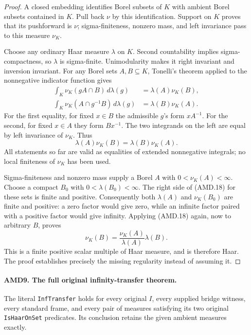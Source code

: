 \documentclass[11pt,a4paper]{article}
\numberwithin{equation}{section}
\theoremstyle{remark}\newtheorem{remark}[theorem]{Remark}
\begin{document}
\begin{proof}
A closed embedding identifies Borel subsets of \(K\) with
ambient Borel subsets contained in \(K\).  Pull back \(\nu\)
by this identification.  Support on \(K\) proves that its
pushforward is \(\nu\); sigma-finiteness, nonzero mass, and
left invariance pass to this measure \(\nu_K\).

Choose any ordinary Haar measure \(\lambda\) on \(K\).
Second countability implies sigma-compactness, so \(\lambda\)
is sigma-finite.  Unimodularity makes it right invariant and
inversion invariant.  For any Borel sets \(A,B\subseteq K\),
Tonelli's theorem applied to the nonnegative indicator function
gives
\[
\begin{split}
 \int_K\nu_K(gA\cap B)\,d\lambda(g)
        &=\lambda(A)\nu_K(B),\\
 \int_K\nu_K(A\cap g^{-1}B)\,d\lambda(g)
        &=\lambda(B)\nu_K(A).
\end{split}
 \tag{AMD.17}
\]
For the first equality, for fixed \(x\in B\) the admissible
\(g\)'s form \(xA^{-1}\).  For the second, for fixed
\(x\in A\) they form \(Bx^{-1}\).  The two integrands on
the left are equal by left invariance of \(\nu_K\).  Thus
\[
                \lambda(A)\nu_K(B)
                     =\lambda(B)\nu_K(A).
 \tag{AMD.18}
\]
All statements so far are valid as equalities of extended
nonnegative integrals; no local finiteness of \(\nu_K\)
has been used.

Sigma-finiteness and nonzero mass supply a Borel \(A\) with
\(0<\nu_K(A)<\infty\).  Choose a compact \(B_0\) with
\(0<\lambda(B_0)<\infty\).  The right side of (AMD.18) for
these sets is finite and positive.  Consequently both
\(\lambda(A)\) and \(\nu_K(B_0)\) are finite and positive:
a zero factor would give zero, while an infinite factor paired
with a positive factor would give infinity.  Applying (AMD.18)
again, now to arbitrary \(B\), proves
\[
             \nu_K(B)=
                \frac{\nu_K(A)}{\lambda(A)}\lambda(B).
 \tag{AMD.19}
\]
This is a finite positive scalar multiple of Haar measure, and
is therefore Haar.  The proof establishes precisely the missing
regularity instead of assuming it.
\end{proof}

\paragraph{AMD9. The full original infinity-transfer theorem.}
\label{claim:AMD9}
The literal \texttt{Inf\allowbreak Transfer} holds for every original
\(I\), every supplied bridge witness, every standard frame,
and every pair of measures satisfying its two original
\texttt{Is\allowbreak Haar\allowbreak On\allowbreak Set} predicates.  Its conclusion retains the
given ambient measures exactly.
\end{document}
